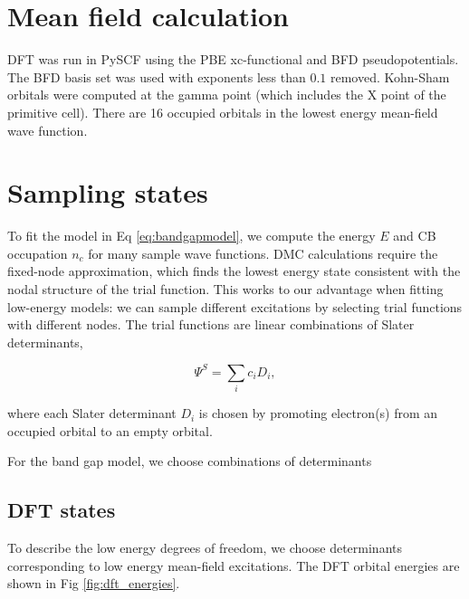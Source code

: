 \section{Mean field calculation}

DFT was run in PySCF using the PBE xc-functional and BFD pseudopotentials.
The BFD basis set was used with exponents less than $0.1$ removed.
Kohn-Sham orbitals were computed at the gamma point (which includes the X point of the primitive cell).
There are 16 occupied orbitals in the lowest energy mean-field wave function.


\section {Sampling states}

To fit the model in Eq \ref{eq:bandgapmodel}, we compute the energy $E$ and CB occupation $n_c$ for many sample wave functions.
DMC calculations require the fixed-node approximation, which finds the lowest energy state consistent with the nodal structure of the trial function.
This works to our advantage when fitting low-energy models: we can sample different excitations by selecting trial functions with different nodes. 
The trial functions are linear combinations of Slater determinants,

\begin{equation}
\Psi^S = \sum_i c_i D_i,
\end{equation}

where each Slater determinant $D_i$ is chosen by promoting electron(s) from an occupied orbital to an empty orbital.


For the band gap model, we choose combinations of determinants 


\subsection{DFT states}
To describe the low energy degrees of freedom, we choose determinants corresponding to low energy mean-field excitations.
The DFT orbital energies are shown in Fig \ref{fig:dft_energies}.

